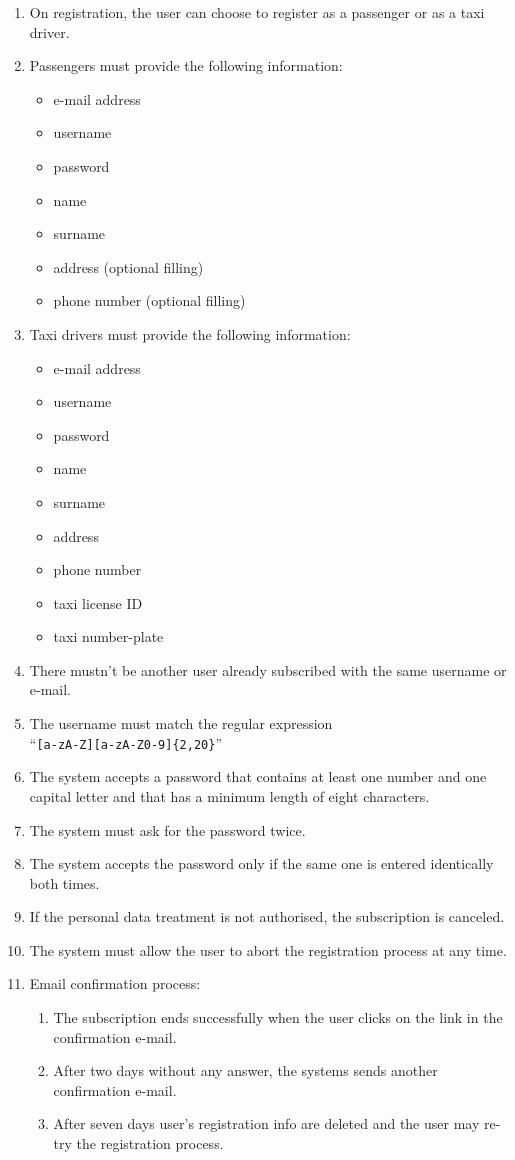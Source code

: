 \begin{enumerate}
    \item On registration, the user can choose to register as a passenger or as a taxi driver.
    \item Passengers must provide the following information:
    \begin{itemize}
        \item e-mail address
        \item username
        \item password
        \item name
        \item surname
        \item address (optional filling)
        \item phone number (optional filling)
    \end{itemize}
    \item Taxi drivers must provide the following information:
    \begin{itemize}
        \item e-mail address
        \item username
        \item password
        \item name
        \item surname
        \item address
        \item phone number
        \item taxi license ID
        \item taxi number-plate
    \end{itemize}
    \item There mustn't be another user already subscribed with the same username or e-mail.
    \item The username must match the regular expression\\``\texttt{[a-zA-Z][a-zA-Z0-9]\{2,20\}}''
    \item The system accepts a password that contains at least one number and one capital letter and that has a minimum length of eight characters.
    \item The system must ask for the password twice.
    \item The system accepts the password only if the same one is entered identically both times.
    \item If the personal data treatment is not authorised, the subscription is canceled.
    \item The system must allow the user to abort the registration process at any time.
    \item Email confirmation process:
    \begin{enumerate}
    \item The subscription ends successfully when the user clicks on the link in the confirmation e-mail.
    \item After two days without any answer, the systems sends another confirmation e-mail.
    \item After seven days user's registration info are deleted and the user may re-try the registration process.
   \end{enumerate}
\end{enumerate}
